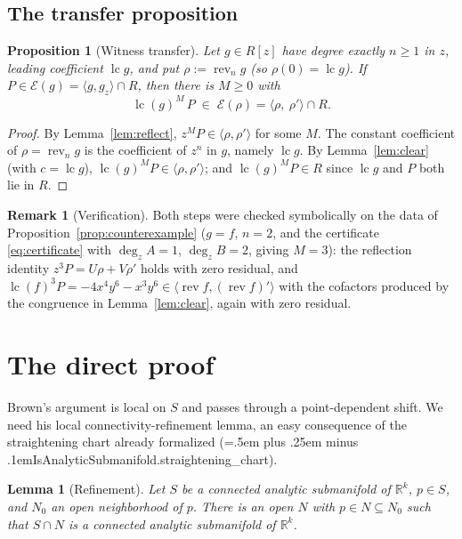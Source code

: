 \documentclass[11pt,a4paper]{article}
\newtheorem{lemma}[theorem]{Lemma}
\newtheorem{proposition}[theorem]{Proposition}
\theoremstyle{definition}
\newtheorem{remark}[theorem]{Remark}
\newcommand{\R}{\mathbb{R}}
\newcommand{\lc}{\operatorname{lc}}
\newcommand{\rev}{\operatorname{rev}}
\newcommand{\E}{\mathcal{E}}
\newcommand{\ideal}[1]{\langle #1\rangle}
\newcommand{\code}[1]{{\ttfamily\spaceskip=.5em plus .25em minus .1em\relax #1}}
\begin{document}
\subsection{The transfer proposition}

\begin{proposition}[Witness transfer]\label{prop:transfer}
Let $g \in R[z]$ have degree exactly $n \geq 1$ in $z$, leading coefficient
$\lc g$, and put $\rho := \rev_n g$ (so $\rho(0) = \lc g$). If
$P \in \E(g) = \ideal{g,g_z}\cap R$, then there is $M \geq 0$ with
\[
  \lc(g)^{M}\,P \;\in\; \E(\rho) = \ideal{\rho,\ \rho'}\cap R .
\]
\end{proposition}

\begin{proof}
By Lemma~\ref{lem:reflect}, $z^M P \in \ideal{\rho,\rho'}$ for some $M$. The
constant coefficient of $\rho = \rev_n g$ is the coefficient of $z^n$ in $g$,
namely $\lc g$. By Lemma~\ref{lem:clear} (with $c = \lc g$),
$\lc(g)^M P \in \ideal{\rho,\rho'}$; and $\lc(g)^M P \in R$ since $\lc g$ and
$P$ both lie in $R$.
\end{proof}

\begin{remark}[Verification]\label{rem:verify}
Both steps were checked symbolically on the data of
Proposition~\ref{prop:counterexample} ($g = f$, $n = 2$, and the certificate
\eqref{eq:certificate} with $\deg_z A = 1$, $\deg_z B = 2$, giving $M = 3$):
the reflection identity $z^3 P = U\rho + V\rho'$ holds with zero residual, and
$\lc(f)^3 P = -4x^4y^6 - x^3y^6 \in \ideal{\rev f, (\rev f)'}$ with the
cofactors produced by the congruence in Lemma~\ref{lem:clear}, again with zero
residual.
\end{remark}

\section{The direct proof}\label{sec:main}

Brown's argument is local on $S$ and passes through a point-dependent shift.
We need his local connectivity-refinement lemma, an easy consequence of the
straightening chart already formalized
(\code{IsAnalyticSubmanifold.straightening\_chart}).

\begin{lemma}[Refinement]\label{lem:refine}
Let $S$ be a connected analytic submanifold of $\R^k$, $p \in S$, and $N_0$ an
open neighborhood of $p$. There is an open $N$ with $p \in N \subseteq N_0$
such that $S \cap N$ is a connected analytic submanifold of $\R^k$.
\end{lemma}
\end{document}
